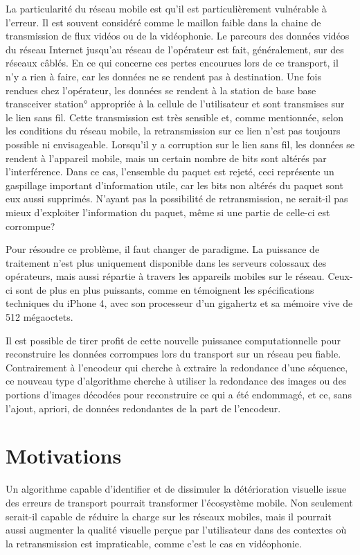 La particularité du réseau mobile est qu'il est particulièrement vulnérable à
l'erreur. Il est souvent considéré comme le maillon faible dans la chaine de
transmission de flux vidéos ou de la vidéophonie. Le parcours des données vidéos
du réseau Internet jusqu'au réseau de l'opérateur est fait, généralement, sur
des réseaux câblés. En ce qui concerne ces pertes encourues lors de ce
transport, il n'y a rien à faire, car les données ne se rendent pas à
destination. Une fois rendues chez l'opérateur, les données se rendent à la
station de base \ang{base transceiver station} appropriée à la cellule de
l'utilisateur et sont transmises sur le lien sans fil. Cette transmission est
très sensible et, comme mentionnée, selon les conditions du réseau mobile, la
retransmission sur ce lien n'est pas toujours possible ni envisageable.
Lorsqu'il y a corruption sur le lien sans fil, les données se rendent à
l'appareil mobile, mais un certain nombre de bits sont altérés par
l'interférence. Dans ce cas, l'ensemble du paquet est rejeté, ceci représente un
gaspillage important d'information utile, car les bits non altérés du paquet
sont eux aussi supprimés. N'ayant pas la possibilité de retransmission, ne
serait-il pas mieux d'exploiter l'information du paquet, même si une partie de
celle-ci est corrompue?

Pour résoudre ce problème, il faut changer de paradigme. La puissance de
traitement n'est plus uniquement disponible dans les serveurs colossaux des
opérateurs, mais aussi répartie à travers les appareils mobiles sur le réseau.
Ceux-ci sont de plus en plus puissants, comme en témoignent les spécifications
techniques du iPhone 4, avec son processeur d'un gigahertz et sa mémoire vive de
512 mégaoctets.

Il est possible de tirer profit de cette nouvelle puissance computationnelle
pour reconstruire les données corrompues lors du transport sur un réseau peu
fiable. Contrairement à l'encodeur qui cherche à extraire la redondance d'une
séquence, ce nouveau type d'algorithme cherche à utiliser la redondance des
images ou des portions d'images décodées pour reconstruire ce qui a été
endommagé, et ce, sans l'ajout, apriori, de données redondantes de la part de
l'encodeur.

\section*{Motivations}
Un algorithme capable d'identifier et de dissimuler la détérioration visuelle
issue des erreurs de transport pourrait transformer l'écosystème mobile. Non
seulement serait-il capable de réduire la charge sur les réseaux mobiles, mais
il pourrait aussi augmenter la qualité visuelle perçue par l'utilisateur dans
des contextes où la retransmission est impraticable, comme c'est le cas en
vidéophonie.

